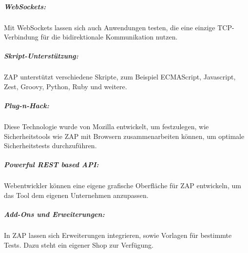 \subparagraph{WebSockets:}

Mit WebSockets lassen sich auch Anwendungen testen, die eine einzige TCP-Verbindung für die bidirektionale Kommunikation nutzen.

\subparagraph{Skript-Unterstützung:}

ZAP unterstützt verschiedene Skripte, zum Beispiel ECMAScript, Javascript, Zest, Groovy,  Python, Ruby und weitere.

\subparagraph{Plug-n-Hack:}

Diese Technologie wurde von Mozilla entwickelt, um festzulegen, wie Sicherheitstools wie ZAP mit Browsern zusammenarbeiten können, um optimale Sicherheitstests durchzuführen.

\subparagraph{Powerful REST based API:}

Webentwickler können eine eigene grafische Oberfläche für ZAP entwickeln, um das Tool dem eigenen Unternehmen anzupassen.

\subparagraph{Add-Ons und Erweiterungen:}

In ZAP lassen sich Erweiterungen integrieren, sowie Vorlagen für bestimmte Tests. Dazu steht ein eigener Shop zur Verfügung.

\newpage\null\thispagestyle{empty}\newpage